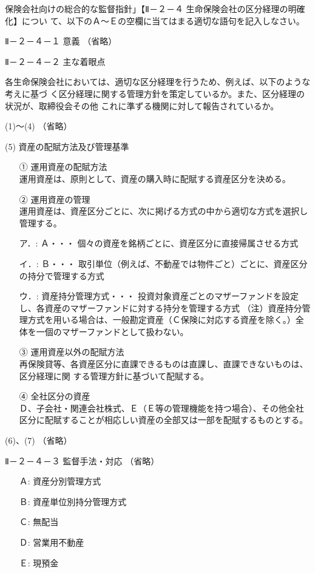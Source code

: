 \documentclass[report,gutter=10mm,fore-edge=10mm,uplatex,dvipdfmx]{jlreq}
\begin{document}
保険会社向けの総合的な監督指針」【Ⅱ－２－４ 生命保険会社の区分経理の明確化】につい
て、以下のＡ～Ｅの空欄に当てはまる適切な語句を記入しなさい。

Ⅱ－２－４－１ 意義 （省略）

Ⅱ－２－４－２ 主な着眼点

各生命保険会社においては、適切な区分経理を行うため、例えば、以下のような考えに基づ
く区分経理に関する管理方針を策定しているか。また、区分経理の状況が、取締役会その他
これに準ずる機関に対して報告されているか。

(1)～(4) （省略）

(5) 資産の配賦方法及び管理基準
\begin{itemize}
\item[①] 運用資産の配賦方法\\
運用資産は、原則として、資産の購入時に配賦する資産区分を決める。
\item[②] 運用資産の管理\\
運用資産は、資産区分ごとに、次に掲げる方式の中から適切な方式を選択し管理する。
\item[ア．: ] Ａ・・・ 個々の資産を銘柄ごとに、資産区分に直接帰属させる方式
\item[イ．: ] Ｂ・・・ 取引単位（例えば、不動産では物件ごと）ごとに、資産区分の持分で管理する方式
\item[ウ．: ]  資産持分管理方式・・・ 投資対象資産ごとのマザーファンドを設定し、各資産のマザーファンドに対する持分を管理する方式
（注）資産持分管理方式を用いる場合は、一般勘定資産（Ｃ保険に対応する資産を除く。）全体を一個のマザーファンドとして扱わない。
\item[③] 運用資産以外の配賦方法\\
再保険貸等、各資産区分に直課できるものは直課し、直課できないものは、区分経理に関
する管理方針に基づいて配賦する。
\item[④] 全社区分の資産\\
Ｄ、子会社・関連会社株式、Ｅ（Ｅ等の管理機能を持つ場合）、その他全社区分に配賦することが相応しい資産の全部又は一部を配賦するものとする。
\end{itemize}
(6)、(7) （省略）

Ⅱ－２－４－３ 監督手法・対応 （省略）

\answer{}
\begin{itemize}
\item[ Ａ: ] 資産分別管理方式
\item[ Ｂ: ] 資産単位別持分管理方式
\item[ Ｃ: ] 無配当
\item[ Ｄ: ] 営業用不動産
\item[ Ｅ: ] 現預金
\end{itemize}
\end{document}
